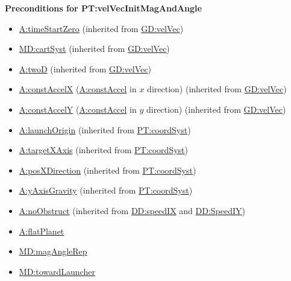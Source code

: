 \documentclass[12pt]{article}
\begin{document}
\noindent \textbf{Preconditions for PT:velVecInitMagAndAngle}
\begin{itemize}
\item \hyperref[timeStartZero]{A:timeStartZero} (inherited from \hyperref[GD:velVec]{GD:velVec})
\item \hyperref[MD:cartSyst]{MD:cartSyst} (inherited from \hyperref[GD:velVec]{GD:velVec})
\item \hyperref[twoD]{A:twoD} (inherited from \hyperref[GD:velVec]{GD:velVec})
\item \hyperref[constAccelX]{A:constAccelX} (\hyperref[constAccel]{A:constAccel}
in $x$ direction) (inherited from \hyperref[GD:velVec]{GD:velVec})
\item \hyperref[constAccelY]{A:constAccelY} (\hyperref[constAccel]{A:constAccel}
in $y$ direction) (inherited from \hyperref[GD:velVec]{GD:velVec})
\item \hyperref[launchOrigin]{A:launchOrigin} (inherited from \hyperref[PT:coordSyst]{PT:coordSyst})
\item \hyperref[targetXAxis]{A:targetXAxis} (inherited from \hyperref[PT:coordSyst]{PT:coordSyst})
\item \hyperref[posXDirection]{A:posXDirection} (inherited from \hyperref[PT:coordSyst]{PT:coordSyst})
\item \hyperref[yAxisGravity]{A:yAxisGravity} (inherited from \hyperref[PT:coordSyst]{PT:coordSyst})
\item \hyperref[noObstruct]{A:noObstruct} (inherited from \hyperref[DD:speedIX]{DD:speedIX} and \hyperref[DD:SpeedIY]{DD:SpeedIY})
\item \hyperref[flatPlanet]{A:flatPlanet}
\item \hyperref[MD:magAngleRep]{MD:magAngleRep}
\item \hyperref[MD:towardLauncher]{MD:towardLauncher}
\end{itemize}
\end{document}
